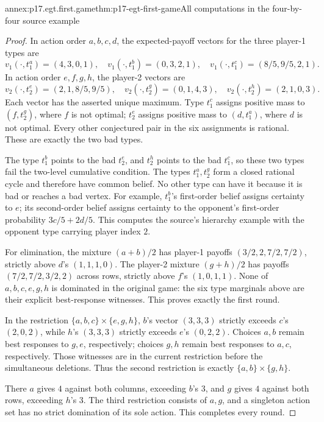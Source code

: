 \begin{annexitem}{annex:p17.egt.first.game}{thm:p17-egt-first-game}{All computations in the four-by-four source example}
\begin{proof}
In action order \(a,b,c,d\), the expected-payoff vectors for
the three player-1 types are
\[
 v_1(\cdot,t_1^a)=(4,3,0,1),\quad
 v_1(\cdot,t_1^b)=(0,3,2,1),\quad
 v_1(\cdot,t_1^c)=(8/5,9/5,2,1).
\]
In action order \(e,f,g,h\), the player-2 vectors are
\[
 v_2(\cdot,t_2^e)=(2,1,8/5,9/5),\quad
 v_2(\cdot,t_2^g)=(0,1,4,3),\quad
 v_2(\cdot,t_2^h)=(2,1,0,3).
\]
Each vector has the asserted unique maximum.
Type \(t_1^c\) assigns positive mass to \((f,t_2^g)\),
where \(f\) is not optimal; \(t_2^e\) assigns positive
mass to \((d,t_1^a)\), where \(d\) is not optimal.
Every other conjectured pair in the six assignments is rational.
These are exactly the two bad types.

The type \(t_1^b\) points to the bad \(t_2^e\), and
\(t_2^h\) points to the bad \(t_1^c\), so these two types
fail the two-level cumulative condition.
The types \(t_1^a,t_2^g\) form a closed rational cycle and
therefore have common belief. No other type can have it
because it is bad or reaches a bad vertex.
For example, \(t_1^b\)'s first-order belief assigns certainty
to \(e\); its second-order belief assigns certainty to the
opponent's first-order probability \(3c/5+2d/5\).
This computes the source's hierarchy example with the
opponent type carrying player index \(2\).

For elimination, the mixture \((a+b)/2\) has player-1 payoffs
\((3/2,2,7/2,7/2)\), strictly above \(d\)'s
\((1,1,1,0)\). The player-2 mixture \((g+h)/2\) has payoffs
\((7/2,7/2,3/2,2)\) across rows, strictly above \(f\)'s
\((1,0,1,1)\).
None of \(a,b,c,e,g,h\) is dominated in the original game:
the six type marginals above are their explicit best-response
witnesses. This proves exactly the first round.

In the restriction \(\{a,b,c\}\times\{e,g,h\}\),
\(b\)'s vector \((3,3,3)\) strictly exceeds \(c\)'s
\((2,0,2)\), while \(h\)'s \((3,3,3)\) strictly exceeds
\(e\)'s \((0,2,2)\).
Choices \(a,b\) remain best responses to \(g,e\),
respectively; choices \(g,h\) remain best responses to
\(a,c\), respectively. Those witnesses are in the current
restriction before the simultaneous deletions.
Thus the second restriction is exactly
\(\{a,b\}\times\{g,h\}\).

There \(a\) gives \(4\) against both columns, exceeding
\(b\)'s \(3\), and \(g\) gives \(4\) against both rows,
exceeding \(h\)'s \(3\). The third restriction consists
of \(a,g\), and a singleton action set has no strict
domination of its sole action. This completes every round.
\end{proof}
\end{annexitem}

